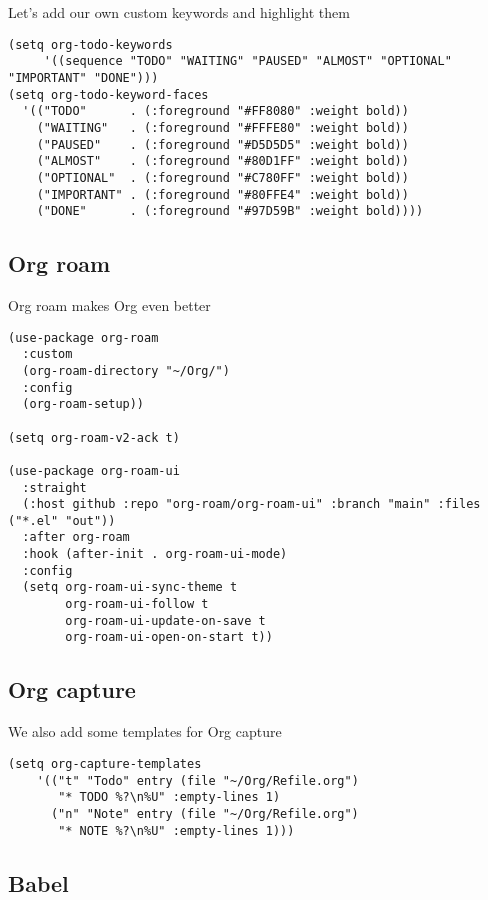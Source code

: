 \documentclass[11pt]{article}
\begin{document}
Let's add our own custom keywords and highlight them

\begin{verbatim}
(setq org-todo-keywords
     '((sequence "TODO" "WAITING" "PAUSED" "ALMOST" "OPTIONAL" "IMPORTANT" "DONE")))
(setq org-todo-keyword-faces
  '(("TODO"      . (:foreground "#FF8080" :weight bold))
    ("WAITING"   . (:foreground "#FFFE80" :weight bold))
    ("PAUSED"    . (:foreground "#D5D5D5" :weight bold))
    ("ALMOST"    . (:foreground "#80D1FF" :weight bold))
    ("OPTIONAL"  . (:foreground "#C780FF" :weight bold))
    ("IMPORTANT" . (:foreground "#80FFE4" :weight bold))
    ("DONE"      . (:foreground "#97D59B" :weight bold))))
\end{verbatim}

\subsection*{Org roam}
\label{sec:org4061f22}

Org roam makes Org even better

\begin{verbatim}
(use-package org-roam
  :custom
  (org-roam-directory "~/Org/")
  :config
  (org-roam-setup))

(setq org-roam-v2-ack t)

(use-package org-roam-ui
  :straight
  (:host github :repo "org-roam/org-roam-ui" :branch "main" :files ("*.el" "out"))
  :after org-roam
  :hook (after-init . org-roam-ui-mode)
  :config
  (setq org-roam-ui-sync-theme t
        org-roam-ui-follow t
        org-roam-ui-update-on-save t
        org-roam-ui-open-on-start t))
\end{verbatim}

\subsection*{Org capture}
\label{sec:orgde42655}

We also add some templates for Org capture

\begin{verbatim}
(setq org-capture-templates
    '(("t" "Todo" entry (file "~/Org/Refile.org")
       "* TODO %?\n%U" :empty-lines 1)
      ("n" "Note" entry (file "~/Org/Refile.org")
       "* NOTE %?\n%U" :empty-lines 1)))
\end{verbatim}

\subsection*{Babel}
\label{sec:org9b11c41}
\end{document}
